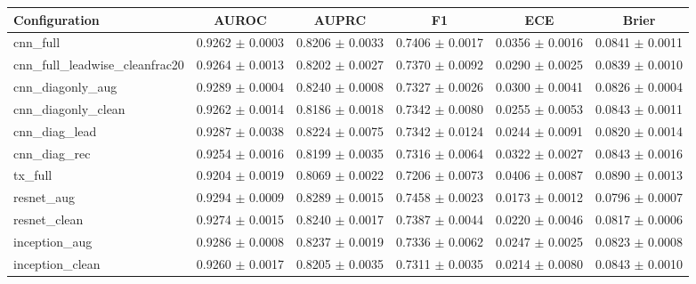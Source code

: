 \begin{tabular}{lccccc}
\toprule
Configuration & AUROC & AUPRC & F1 & ECE & Brier \\
\midrule
cnn\_full & 0.9262 $\pm$ 0.0003 & 0.8206 $\pm$ 0.0033 & 0.7406 $\pm$ 0.0017 & 0.0356 $\pm$ 0.0016 & 0.0841 $\pm$ 0.0011 \\
cnn\_full\_leadwise\_cleanfrac20 & 0.9264 $\pm$ 0.0013 & 0.8202 $\pm$ 0.0027 & 0.7370 $\pm$ 0.0092 & 0.0290 $\pm$ 0.0025 & 0.0839 $\pm$ 0.0010 \\
cnn\_diagonly\_aug & 0.9289 $\pm$ 0.0004 & 0.8240 $\pm$ 0.0008 & 0.7327 $\pm$ 0.0026 & 0.0300 $\pm$ 0.0041 & 0.0826 $\pm$ 0.0004 \\
cnn\_diagonly\_clean & 0.9262 $\pm$ 0.0014 & 0.8186 $\pm$ 0.0018 & 0.7342 $\pm$ 0.0080 & 0.0255 $\pm$ 0.0053 & 0.0843 $\pm$ 0.0011 \\
cnn\_diag\_lead & 0.9287 $\pm$ 0.0038 & 0.8224 $\pm$ 0.0075 & 0.7342 $\pm$ 0.0124 & 0.0244 $\pm$ 0.0091 & 0.0820 $\pm$ 0.0014 \\
cnn\_diag\_rec & 0.9254 $\pm$ 0.0016 & 0.8199 $\pm$ 0.0035 & 0.7316 $\pm$ 0.0064 & 0.0322 $\pm$ 0.0027 & 0.0843 $\pm$ 0.0016 \\
tx\_full & 0.9204 $\pm$ 0.0019 & 0.8069 $\pm$ 0.0022 & 0.7206 $\pm$ 0.0073 & 0.0406 $\pm$ 0.0087 & 0.0890 $\pm$ 0.0013 \\
resnet\_aug & 0.9294 $\pm$ 0.0009 & 0.8289 $\pm$ 0.0015 & 0.7458 $\pm$ 0.0023 & 0.0173 $\pm$ 0.0012 & 0.0796 $\pm$ 0.0007 \\
resnet\_clean & 0.9274 $\pm$ 0.0015 & 0.8240 $\pm$ 0.0017 & 0.7387 $\pm$ 0.0044 & 0.0220 $\pm$ 0.0046 & 0.0817 $\pm$ 0.0006 \\
inception\_aug & 0.9286 $\pm$ 0.0008 & 0.8237 $\pm$ 0.0019 & 0.7336 $\pm$ 0.0062 & 0.0247 $\pm$ 0.0025 & 0.0823 $\pm$ 0.0008 \\
inception\_clean & 0.9260 $\pm$ 0.0017 & 0.8205 $\pm$ 0.0035 & 0.7311 $\pm$ 0.0035 & 0.0214 $\pm$ 0.0080 & 0.0843 $\pm$ 0.0010 \\
\bottomrule
\end{tabular}
